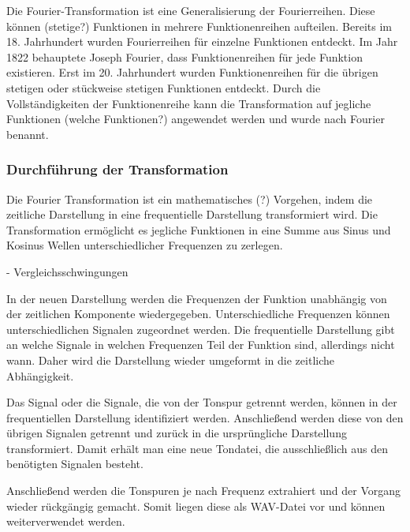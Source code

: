 Die Fourier-Transformation ist eine Generalisierung der Fourierreihen. Diese können (stetige?) Funktionen in mehrere Funktionenreihen aufteilen. Bereits im 18. Jahrhundert wurden Fourierreihen für einzelne Funktionen entdeckt. Im Jahr 1822 behauptete Joseph Fourier, dass Funktionenreihen für jede Funktion existieren. Erst im 20. Jahrhundert wurden Funktionenreihen für die übrigen stetigen oder stückweise stetigen Funktionen entdeckt. Durch die Vollständigkeiten der Funktionenreihe kann die Transformation auf jegliche Funktionen (welche Funktionen?) angewendet werden und wurde nach Fourier benannt.

\par

\subsubsection{Durchführung der Transformation}

Die Fourier Transformation ist ein mathematisches (?) Vorgehen, indem die zeitliche Darstellung in eine frequentielle Darstellung transformiert wird. Die Transformation ermöglicht es jegliche Funktionen in eine Summe aus Sinus und Kosinus Wellen unterschiedlicher Frequenzen zu zerlegen.

\par

 - Vergleichsschwingungen
 
\par

In der neuen Darstellung werden die Frequenzen der Funktion unabhängig von der zeitlichen Komponente wiedergegeben. Unterschiedliche Frequenzen können unterschiedlichen Signalen zugeordnet werden. Die frequentielle Darstellung gibt an welche Signale in welchen Frequenzen Teil der Funktion sind, allerdings nicht wann. Daher wird die Darstellung wieder umgeformt in die zeitliche Abhängigkeit. 

\par

Das Signal oder die Signale, die von der Tonspur getrennt werden, können in der frequentiellen Darstellung identifiziert werden. Anschließend werden diese von den übrigen Signalen getrennt und zurück in die ursprüngliche Darstellung transformiert. Damit erhält man eine neue Tondatei, die ausschließlich aus den benötigten Signalen besteht.

\par

Anschließend werden die Tonspuren je nach Frequenz extrahiert und der Vorgang wieder rückgängig gemacht. Somit liegen diese als WAV-Datei vor und können weiterverwendet werden.

